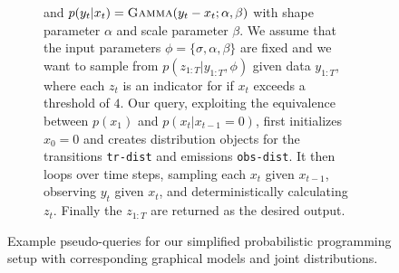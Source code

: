 \begin{figure}[p]
\begin{subfigure}[t]{\textwidth}
{				and $p(y_t | x_t) = \textsc{Gamma}(y_t-x_t ; \alpha, \beta)$ with
				shape parameter $\alpha$ and scale parameter $\beta$.  We assume that the input
				parameters $\phi = \{\sigma,\alpha,\beta\}$ are fixed and we want
				to sample from $p(z_{1:T} | y_{1:T}, \phi)$ given data $y_{1:T}$, where each 
				$z_t$ is an indicator for if $x_{t}$ exceeds a threshold of $4$. Our query, exploiting the
				equivalence between $p(x_1)$ and $p(x_t|x_{t-1}=0)$, first initializes $x_0=0$ and creates
				distribution objects for the transitions \lstinline$tr-dist$\xspace and emissions
				\lstinline$obs-dist$\xspace.  It then loops over time steps, sampling each $x_t$ given
				$x_{t-1}$, observing $y_t$ given $x_t$, and deterministically calculating $z_t$.  Finally
				the $z_{1:T}$ are returned as the desired output.
				\label{fig:probprog:LGSSM}
				}
		\end{subfigure}
		\vspace{5pt}
\caption{Example pseudo-queries for our simplified probabilistic programming setup with
	corresponding graphical models and joint distributions.\label{fig:probprog:example-progs}}
\end{figure}


